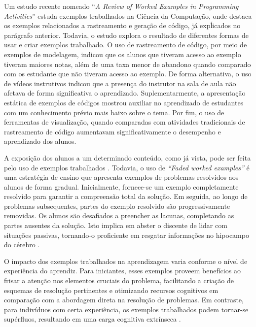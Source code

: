 Um estudo recente nomeado ``\textit{A Review of Worked Examples in Programming Activities}''\cite{KasiaMuldner:2023} estuda exemplos trabalhados na Ciência da Computação, onde destaca os exemplos relacionados a rastreamento e geração de código, já expĺicados no parágrafo anterior. Todavia, o estudo explora o resultado de diferentes formas de usar e criar exemplos trabalhado. O uso de rastreamento de código, por meio de exemplos de modelagem, indicou que os alunos que tiveram acesso ao exemplo tiveram maiores notas, além de uma taxa menor de abandono quando comparado com os estudante que não tiveram acesso ao exemplo. De forma alternativa, o uso de vídeos instrutivos indicou que a presença do instrutor na sala de aula não afetava de forma significativa o aprendizado. Suplementarmente, a apresentação estática de exemplos de códigos mostrou auxiliar no aprendizado de estudantes com um conhecimento prévio mais baixo sobre o tema. Por fim, o uso de ferramentas de visualização, quando comparadas com atividades tradicionais de rastreamento de código aumentavam significativamente o desempenho e aprendizado dos alunos.

A exposição dos alunos a um determinado conteúdo, como já vista, pode ser feita pelo uso de exemplos trabalhados \cite{Robert.Atkinson-etal:2000}. Todavia, o uso de \textit{``Faded worked examples''} é uma estratégia de ensino que apresenta exemplos de problemas resolvidos aos alunos de forma gradual. Inicialmente, fornece-se um exemplo completamente resolvido para garantir a compreensão total da solução. Em seguida, ao longo de problemas subsequentes, partes do exemplo resolvido são progressivamente removidas. Os alunos são desafiados a preencher as lacunas, completando as partes ausentes da solução. Isto implica em abster o discente de lidar com situações passivas, tornando-o proficiente em resgatar informações no hipocampo do cérebro \cite{Skudder-LuxtonReilly:2014}.

O impacto dos exemplos trabalhados na aprendizagem varia conforme o nível de experiência do aprendiz. Para iniciantes, esses exemplos proveem benefícios ao frisar a atenção nos elementos cruciais do problema, facilitando a criação de esquemas de resolução pertinentes e otimizando recursos cognitivos em comparação com a abordagem direta na resolução de problemas. Em contraste, para indivíduos com certa experiência, os exemplos trabalhados podem tornar-se supérfluos, resultando em uma carga cognitiva extrínseca \cite{Skudder-LuxtonReilly:2014}.

